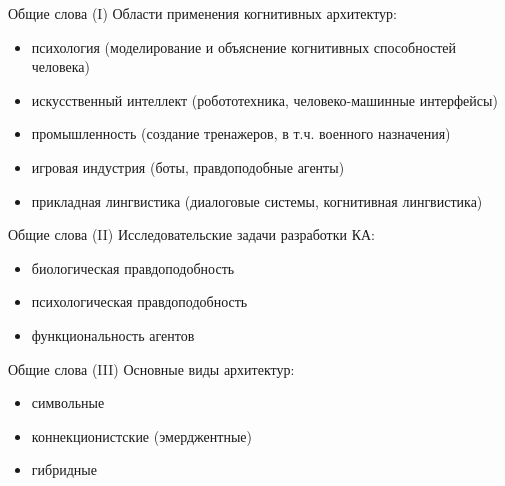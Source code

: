 \documentclass{beamer}
\begin{document}
\begin{frame}{Общие слова (I)}
Области применения когнитивных архитектур:\\
\medskip
\begin{itemize}
	\item психология (моделирование и объяснение когнитивных способностей человека)
	\medskip
	\item искусственный интеллект (робототехника, человеко-машинные интерфейсы)
	\medskip
	\item промышленность (создание тренажеров, в т.ч. военного назначения)
	\medskip 
	\item игровая индустрия (боты, правдоподобные агенты)
	\medskip
	\item прикладная лингвистика (диалоговые системы, когнитивная лингвистика)
\end{itemize}
\end{frame}

\begin{frame}{Общие слова (II)}
Исследовательские задачи разработки КА:\\
\medskip
\begin{itemize}
	\item биологическая правдоподобность
	\medskip
	\item психологическая правдоподобность
	\medskip
	\item функциональность агентов
\end{itemize}
\end{frame}

\begin{frame}{Общие слова (III)}
Основные виды архитектур:\\
\medskip
\begin{itemize}
	\item символьные
	\medskip
	\item коннекционистские (эмерджентные)
	\medskip
	\item гибридные
\end{itemize}
\end{frame}
\end{document}
